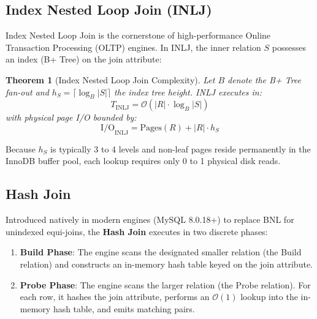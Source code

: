 \documentclass[10pt,twocolumn,letterpaper]{article}
\newtheorem{theorem}{Theorem}
\begin{document}
\subsection{Index Nested Loop Join (INLJ)}
Index Nested Loop Join is the cornerstone of high-performance Online Transaction Processing (OLTP) engines. In INLJ, the inner relation $S$ possesses an index (B+ Tree) on the join attribute:
\begin{theorem}[Index Nested Loop Join Complexity]
Let $B$ denote the B+ Tree fan-out and $h_S = \lceil \log_B |S| \rceil$ the index tree height. INLJ executes in:
\begin{equation}
T_{\text{INLJ}} = \mathcal{O}(|R| \cdot \log_B |S|)
\end{equation}
with physical page I/O bounded by:
\begin{equation}
\text{I/O}_{\text{INLJ}} = \text{Pages}(R) + |R| \cdot h_S
\end{equation}
\end{theorem}
Because $h_S$ is typically 3 to 4 levels and non-leaf pages reside permanently in the InnoDB buffer pool, each lookup requires only 0 to 1 physical disk reads.

\subsection{Hash Join}
Introduced natively in modern engines (MySQL 8.0.18+) to replace BNL for unindexed equi-joins, the \textbf{Hash Join} executes in two discrete phases:
\begin{enumerate}
    \item \textbf{Build Phase}: The engine scans the designated smaller relation (the Build relation) and constructs an in-memory hash table keyed on the join attribute.
    \item \textbf{Probe Phase}: The engine scans the larger relation (the Probe relation). For each row, it hashes the join attribute, performs an $\mathcal{O}(1)$ lookup into the in-memory hash table, and emits matching pairs.
\end{enumerate}
\end{document}
